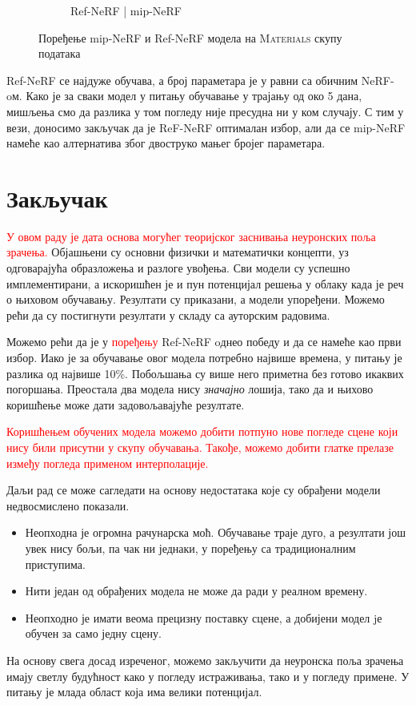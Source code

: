 \documentclass[12pt, a4paper, twoside]{book}
\numberwithin{equation}{chapter}
\numberwithin{theorem}{section}
\numberwithin{definition}{section}
\numberwithin{definitionChapter}{chapter}
\begin{document}
\begin{figure}[H]
\begin{subfigure}{0.475\textwidth}
			\caption{Ref-NeRF | mip-NeRF}
		\end{subfigure}
		\caption{Поређење mip-NeRF и Ref-NeRF модела на \textsc{Materials} скупу података}
		\label{fig-materials-comparison}
	\end{figure}

Ref-NeRF се најдуже обучава, а број параметара је у равни са обичним NeRF-oм. Како је за сваки модел у питању обучавање у трајању од 
око 5 дана, мишљења смо да разлика у том погледу није пресудна ни у ком случају. С тим у вези, доносимо закључак да је ReF-NeRF оптималан
избор, али да се mip-NeRF намеће као алтернатива због двоструко мањег бројег параметара.
 
\chapter{Закључак}
\textcolor{red}{У овом раду је дата основа могућег теоријског заснивања неуронских поља зрачења.} Објашњени су основни физички и математички
концепти, уз одговарајућа образложења и разлоге увођења. Сви модели су успешно имплементирани, а искоришћен је и
пун потенцијал решења у облаку када је реч о њиховом обучавању. Резултати су приказани, а модели упоређени.
Можемо рећи да су постигнути резултати у складу са ауторским радовима.

Можемо рећи да је у \textcolor{red}{поређењу} Ref-NeRF oднео победу и да се намеће као први избор. Иако је за обучавање овог модела потребно 
највише времена, у питању је разлика од највише 10\%. Побољшања су више него приметна без готово икаквих погоршања.
Преостала два модела нису \textit{значајно} лошија, тако да и њихово коришћење може дати задовољавајуће резултате.

\textcolor{red}{Коришћењем обучених модела можемо добити потпуно нове погледе сцене који нису били присутни у скупу обучавања.
Такође, можемо добити глатке прелазе између погледа применом интерполације.}

Даљи рад се може сагледати на основу недостатака које су обрађени модели недвосмислено показали.
\begin{itemize}
	\item Неопходна је огромна рачунарска моћ. Обучавање траје дуго, а резултати још увек нису
	бољи, па чак ни једнаки, у поређењу са традиционалним приступима.
	\item Нити један од обрађених модела не може да ради у реалном времену.
	\item Неопходно је имати веома прецизну поставку сцене, а добијени модел jе обучен за само једну сцену.
\end{itemize}

На основу свега досад изреченог, можемо закључити да неуронска поља зрачења имају светлу будућност како у погледу
истраживања, тако и у погледу примене. У питању је млада област која има велики потенцијал.



\end{document}
